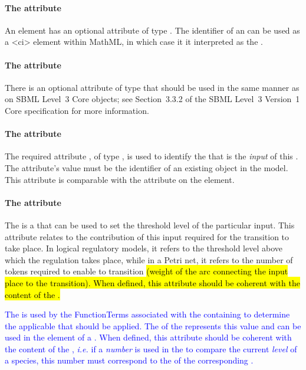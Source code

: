 \paragraph{The  attribute}
An \Input element has an optional  attribute of type . The identifier of an \Input can be used as a 
<ci> element within MathML, in which case it it interpreted as the .

\paragraph{The  attribute}
There is an optional  attribute of type  that should be used
in the same manner as on SBML Level~3 Core
objects; see Section~3.3.2 of the SBML Level~3 Version~1 Core
specification for more information.


\paragraph{The  attribute}
The required attribute , of type , is used to identify the \QualitativeSpecies that is the \emph{input} of this \Transition.  The attribute's value must be the identifier of an existing \QualitativeSpecies object in the model.  This attribute is comparable with the  attribute on the  element.

\paragraph{The   attribute}
The  is a  that can be used to set the threshold level of the particular input. This attribute relates to the contribution of this input required for the transition to take place. In logical regulatory models, it refers to the threshold level above which the regulation takes place, while in a Petri net, it refers to the number of tokens required to enable to transition \hl{(weight of the arc connecting the input place to the transition). When defined, this attribute should be coherent with the content of the \FunctionTerm.}

\textcolor{blue}{The  is used by the FunctionTerms associated with the containing \Transition to determine the applicable  that should be applied. The  of the \Input represents this value and can be used in the  element of a \FunctionTerm. When defined, this attribute should be coherent with the content of the \FunctionTerm, {\em i.e.} if a \emph{number} is used in the \FunctionTerm to compare the current \emph{level} of a species, this number must correspond to the  of the corresponding \Input.}

